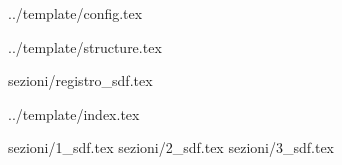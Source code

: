  {../template/config.tex}


\def\DOCUMENTO{Studio di Fattibilit\`a}
\def\VERSIONE{1.0.0}

\def\DESCRIZIONE{<Info documento>}

\def\REDATTORE {Francesco Bizzaro\\ & Gino Zaidan}
\def\VERIFICATORE {Enrico Chiara\\ & Riccardo Rizzo}
\def\RESPONSABILE {Alberto Andriolo}

\def\USO {Interno}

\def\DISTRIBUZIONE {\GRUPPO{}\\ & \COMMITTENTE{}\\}

\def\DESCRIZIONE {Il documento espone il rapporto sull'analisi eseguita dal gruppo Stark Labs che ha portato alla scelta del capitolato SiVoDiM}


\def\INDICE	{true}
\def\TABELLE {false}
\def\FIGURE {false}


 {../template/structure.tex}

 {sezioni/registro_sdf.tex}

 {../template/index.tex}

 {sezioni/1_sdf.tex}
 {sezioni/2_sdf.tex}
 {sezioni/3_sdf.tex}





